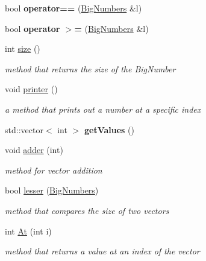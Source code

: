 \begin{DoxyCompactItemize}
\mbox{\label{class_big_numbers_1_1_big_numbers_a7da6fc3a8ea5e1d03515a90ccc76a300}} 
bool {\bfseries operator==} (\mbox{\hyperlink{class_big_numbers_1_1_big_numbers}{Big\+Numbers}} \&l)
\item 
\mbox{\label{class_big_numbers_1_1_big_numbers_ae22aa70180cc64561e12be5a3b5e30f2}} 
bool {\bfseries operator $>$=} (\mbox{\hyperlink{class_big_numbers_1_1_big_numbers}{Big\+Numbers}} \&l)
\item 
int \mbox{\hyperlink{class_big_numbers_1_1_big_numbers_acc40f76e787dd3f8f1d276cfe6a5225f}{size}} ()
\begin{DoxyCompactList}\small\item\em method that returns the size of the Big\+Number \end{DoxyCompactList}\item 
\mbox{\label{class_big_numbers_1_1_big_numbers_aa146ed7336676e611de35a2f7a6ebdc7}} 
void \mbox{\hyperlink{class_big_numbers_1_1_big_numbers_aa146ed7336676e611de35a2f7a6ebdc7}{printer}} ()
\begin{DoxyCompactList}\small\item\em a method that prints out a number at a specific index \end{DoxyCompactList}\item 
\mbox{\label{class_big_numbers_1_1_big_numbers_af92a531da5903c575a63c74e45e80407}} 
std\+::vector$<$ int $>$ {\bfseries get\+Values} ()
\item 
void \mbox{\hyperlink{class_big_numbers_1_1_big_numbers_af2221d705797b836d5043aaaa0f8774f}{adder}} (int)
\begin{DoxyCompactList}\small\item\em method for vector addition \end{DoxyCompactList}\item 
bool \mbox{\hyperlink{class_big_numbers_1_1_big_numbers_a7dbbde79334a8a7a4fc9c502c20fa567}{lesser}} (\mbox{\hyperlink{class_big_numbers_1_1_big_numbers}{Big\+Numbers}})
\begin{DoxyCompactList}\small\item\em method that compares the size of two vectors \end{DoxyCompactList}\item 
int \mbox{\hyperlink{class_big_numbers_1_1_big_numbers_a8c08fae9001723b23352a48440bd212e}{At}} (int i)
\begin{DoxyCompactList}\small\item\em method that returns a value at an index of the vector \end{DoxyCompactList}\end{DoxyCompactItemize}
